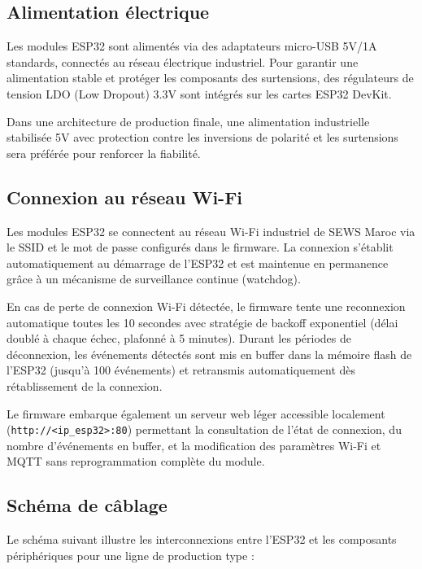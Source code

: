 \subsection{Alimentation électrique}

Les modules ESP32 sont alimentés via des adaptateurs micro-USB 5V/1A standards, connectés au réseau électrique industriel. Pour garantir une alimentation stable et protéger les composants des surtensions, des régulateurs de tension LDO (Low Dropout) 3.3V sont intégrés sur les cartes ESP32 DevKit.

Dans une architecture de production finale, une alimentation industrielle stabilisée 5V avec protection contre les inversions de polarité et les surtensions sera préférée pour renforcer la fiabilité.


\subsection{Connexion au réseau Wi-Fi}

Les modules ESP32 se connectent au réseau Wi-Fi industriel de SEWS Maroc via le SSID et le mot de passe configurés dans le firmware. La connexion s'établit automatiquement au démarrage de l'ESP32 et est maintenue en permanence grâce à un mécanisme de surveillance continue (watchdog).

En cas de perte de connexion Wi-Fi détectée, le firmware tente une reconnexion automatique toutes les 10 secondes avec stratégie de backoff exponentiel (délai doublé à chaque échec, plafonné à 5 minutes). Durant les périodes de déconnexion, les événements détectés sont mis en buffer dans la mémoire flash de l'ESP32 (jusqu'à 100 événements) et retransmis automatiquement dès rétablissement de la connexion.

Le firmware embarque également un serveur web léger accessible localement (\texttt{http://<ip\_esp32>:80}) permettant la consultation de l'état de connexion, du nombre d'événements en buffer, et la modification des paramètres Wi-Fi et MQTT sans reprogrammation complète du module.

\subsection{Schéma de câblage}

Le schéma suivant illustre les interconnexions entre l'ESP32 et les composants périphériques pour une ligne de production type :


